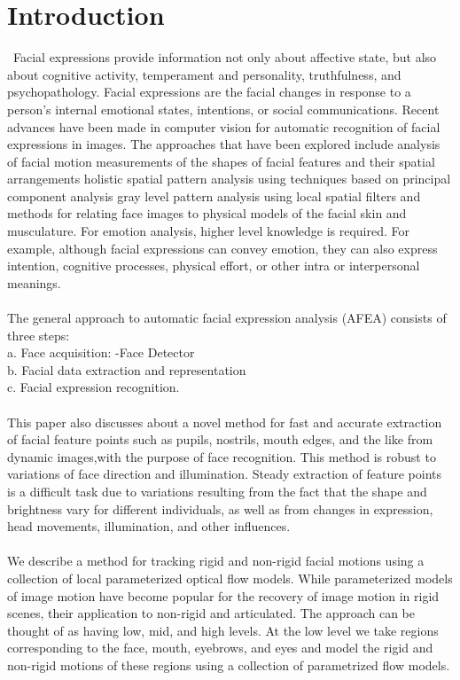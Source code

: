 \documentclass[journal]{IEEEtran}
\begin{document}
\section{Introduction}
\ Facial expressions provide information not only about affective state, but also about cognitive activity, temperament and personality, truthfulness, and psychopathology. Facial expressions are the facial changes in response to a person’s internal emotional states, intentions, or social communications. Recent advances have been made in computer vision for automatic recognition of facial expressions in images. The approaches that have been explored include analysis of facial motion measurements of the shapes of facial features and their spatial arrangements holistic spatial pattern analysis using techniques based on principal component analysis gray level pattern analysis using local spatial filters and methods for relating face images to physical models of the facial skin and musculature. For emotion analysis, higher level knowledge is required. For example, although facial expressions can convey emotion, they can also express intention, cognitive processes, physical effort, or other intra or interpersonal meanings. \\ \\
The general approach to automatic facial expression analysis (AFEA) consists of three steps:\\
a. Face acquisition: -Face Detector \\
b. Facial data extraction and representation \\
c. Facial expression recognition.\\ \\
This paper also discusses about a novel method for fast and accurate extraction of facial feature points such as pupils, nostrils, mouth edges, and the like from dynamic images,with the purpose of face recognition.
This method is robust to variations of face direction and illumination. Steady extraction of feature points is a difficult task due to variations resulting from the fact that the shape and brightness vary for different individuals, as well as from changes in expression, head movements, illumination, and other influences.\\ \\
We describe a method for tracking rigid and non-rigid facial motions using a collection of local parameterized optical flow models. While parameterized models of image motion have become popular for the recovery of image motion in rigid scenes, their application to non-rigid and articulated. The approach can be thought of as having low, mid, and high levels. At the low level we take regions corresponding to the face, mouth, eyebrows, and eyes and model the rigid and non-rigid motions of these regions using a collection of parametrized flow models.
\end{document}
